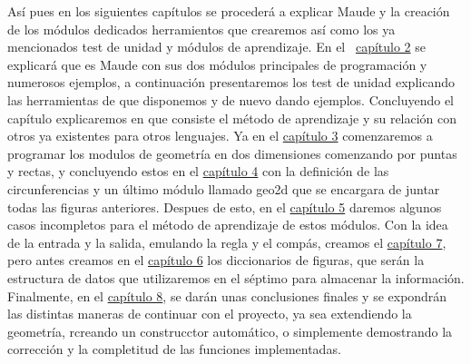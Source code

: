 Así pues en los siguientes capítulos se procederá a explicar Maude y la creación de los módulos dedicados herramientos que crearemos así como los ya mencionados test de unidad y módulos de aprendizaje. En el ~\hyperref[cap.2]{capítulo 2} se explicará que es Maude con sus dos módulos principales de programación y numerosos ejemplos, a continuación presentaremos los test de unidad explicando las herramientas de que disponemos y de nuevo dando ejemplos. Concluyendo el capítulo explicaremos en que consiste el método de aprendizaje y su relación con otros ya existentes para otros lenguajes. Ya en el \hyperref[cap.3]{capítulo 3} comenzaremos a programar los modulos de geometría en dos dimensiones comenzando por puntas y rectas, y concluyendo estos en el \hyperref[cap.4]{capítulo 4} con la definición de las circunferencias y un último módulo llamado geo2d que se encargara de juntar todas las figuras anteriores. Despues de esto, en el \hyperref[cap.5]{capítulo 5} daremos algunos casos incompletos para el método de aprendizaje de estos módulos. Con la idea de la entrada y la salida, emulando la regla y el compás, creamos el \hyperref[cap.7]{capítulo 7}, pero antes creamos en el \hyperref[cap.6]{capítulo 6} los diccionarios de figuras, que serán la estructura de datos que utilizaremos en el séptimo para almacenar la información. Finalmente, en el \hyperref[cap.8]{capítulo 8}, se darán unas conclusiones finales y se expondrán las distintas maneras de continuar con el proyecto, ya sea extendiendo la geometría, rcreando un construcctor automático, o simplemente demostrando la corrección y la completitud de las funciones implementadas.
